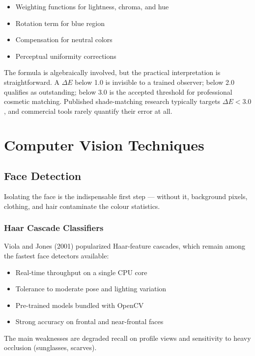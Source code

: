 \begin{itemize}
    \item Weighting functions for lightness, chroma, and hue
    \item Rotation term for blue region
    \item Compensation for neutral colors
    \item Perceptual uniformity corrections
\end{itemize}

The formula is algebraically involved, but the practical interpretation is straightforward. A $\Delta E$ below 1.0 is invisible to a trained observer; below 2.0 qualifies as outstanding; below 3.0 is the accepted threshold for professional cosmetic matching. Published shade-matching research typically targets $\Delta E < 3.0$, and commercial tools rarely quantify their error at all.

\section{Computer Vision Techniques}

\subsection{Face Detection}

Isolating the face is the indispensable first step — without it, background pixels, clothing, and hair contaminate the colour statistics.

\subsubsection{Haar Cascade Classifiers}

Viola and Jones (2001) popularized Haar-feature cascades, which remain among the fastest face detectors available:
\begin{itemize}
    \item Real-time throughput on a single CPU core
    \item Tolerance to moderate pose and lighting variation
    \item Pre-trained models bundled with OpenCV
    \item Strong accuracy on frontal and near-frontal faces
\end{itemize}

The main weaknesses are degraded recall on profile views and sensitivity to heavy occlusion (sunglasses, scarves).

